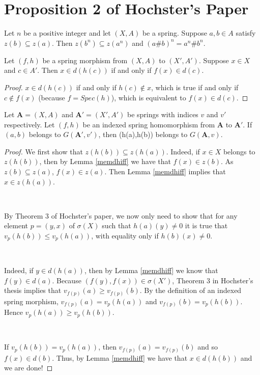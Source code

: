 \chapter{Proposition 2 of Hochster's Paper}


\begin{lemma}\label{zbnmempow}
  Let $n$ be a positive integer and let $(X,A)$ be a spring. Suppose $a,b\in{A}$ satisfy
  $z(b)\subseteq{z(a)}$. Then $z(b^n)\subseteq{z(a^n)}$ and $(a\#b)^n={a^n}\#b^n$.
\end{lemma}


\begin{lemma}\label{memdhiff}
  Let $(f,h)$ be a spring morphism from $(X,A)$ to $(X',A')$. Suppose $x\in{X}$ and $c\in{A'}$.
  Then $x\in{d(h(c))}$ if and only if $f(x)\in{d(c)}$.
\end{lemma}
\begin{proof}
  $x\in{d(h(c))}$ if and only if $h(c)\notin{x}$, which is true if and only if $c\notin{f(x)}$
  (because $f=Spec(h)$), which is equivalent to $f(x)\in{d(c)}$.
\end{proof}


\begin{proposition}\label{memGofmemG}
  Let $\boldsymbol{A}=(X,A)$ and $\boldsymbol{A'}=(X',A')$ be springs with indices $v$ and $v'$
  respectively. Let $(f,h)$ be an indexed spring homomorphism from $\boldsymbol{A}$ to
  $\boldsymbol{A'}$. If $(a,b)$ belongs to $G(\boldsymbol{A'},v')$, then (h(a),h(b)) belongs to
  $G(\boldsymbol{A},v)$.
\end{proposition}
\begin{proof}
  We first show that $z(h(b))\subseteq{z(h(a))}$. Indeed, if $x\in{X}$ belongs to $z(h(b))$, then
  by Lemma \ref{memdhiff} we have that $f(x)\in{z(b)}$. As $z(b)\subseteq{z(a)}$, $f(x)\in{z(a)}$.
  Then Lemma \ref{memdhiff} implies that $x\in{z(h(a))}$.

  \

  By Theorem 3 of Hochster's paper, we now only need to show that for any element $p=(y,x)$ of
  $\sigma(X)$ such that $h(a)(y)\neq{0}$ it is true that $v_p(h(b))\leq{v_p(h(a))}$, with equality
  only if $h(b)(x)\neq{0}$.

  \

  Indeed, if $y\in{d(h(a))}$, then by Lemma \ref{memdhiff} we know that $f(y)\in{d(a)}$. Because
  $(f(y),f(x))\in\sigma(X')$, Theorem 3 in Hochster's thesis implies that
  $v_{f(p)}(a)\geq{v}_{f(p)}(b)$. By the definition of an indexed spring morphism,
  $v_{f(p)}(a)=v_p(h(a))$ and $v_{f(p)}(b)=v_p(h(b))$. Hence $v_p(h(a))\geq{v_p(h(b))}$.

  \

  If $v_p(h(b))={v_p(h(a))}$, then $v_{f(p)}(a)={v}_{f(p)}(b)$ and so $f(x)\in{d(b)}$. Thus, by
  Lemma \ref{memdhiff} we have that $x\in{d(h(b))}$ and we are done!
\end{proof}


